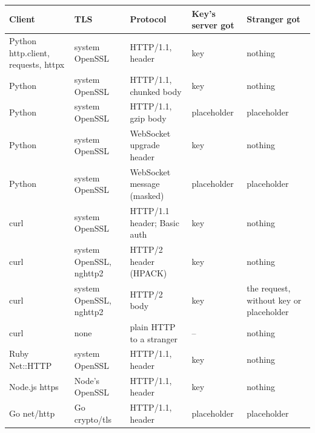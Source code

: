 \documentclass[
  11pt]{article}
\newcounter{none} %
\begin{document}
{\def\LTcaptype{none} %
\begin{longtable}[]{@{}
  >{\raggedright\arraybackslash}p{}
  >{\raggedright\arraybackslash}p{}
  >{\raggedright\arraybackslash}p{}
  >{\raggedright\arraybackslash}p{}
  >{\raggedright\arraybackslash}p{}@{}}
\toprule\noalign{}
\begin{minipage}[b]{\linewidth}\raggedright
Client
\end{minipage} &
\begin{minipage}[b]{\linewidth}\raggedright
TLS
\end{minipage} &
\begin{minipage}[b]{\linewidth}\raggedright
Protocol
\end{minipage} &
\begin{minipage}[b]{\linewidth}\raggedright
Key's server got
\end{minipage} &
\begin{minipage}[b]{\linewidth}\raggedright
Stranger got
\end{minipage} \\
\midrule\noalign{}
\endhead
\bottomrule\noalign{}
\endlastfoot
Python http.client, requests, httpx &
system OpenSSL & HTTP/1.1, header & key
& nothing \\
Python & system OpenSSL & HTTP/1.1,
chunked body & key & nothing \\
Python & system OpenSSL & HTTP/1.1, gzip
body & placeholder & placeholder \\
Python & system OpenSSL & WebSocket
upgrade header & key & nothing \\
Python & system OpenSSL & WebSocket
message (masked) & placeholder &
placeholder \\
curl & system OpenSSL & HTTP/1.1 header;
Basic auth & key & nothing \\
curl & system OpenSSL, nghttp2 & HTTP/2
header (HPACK) & key & nothing \\
curl & system OpenSSL, nghttp2 & HTTP/2
body & key & the request, without key or
placeholder \\
curl & none & plain HTTP to a stranger &
-- & nothing \\
Ruby Net::HTTP & system OpenSSL &
HTTP/1.1, header & key & nothing \\
Node.js https & Node's OpenSSL &
HTTP/1.1, header & key & nothing \\
Go net/http & Go crypto/tls & HTTP/1.1,
header & placeholder & placeholder \\
\end{longtable}
}
\end{document}
